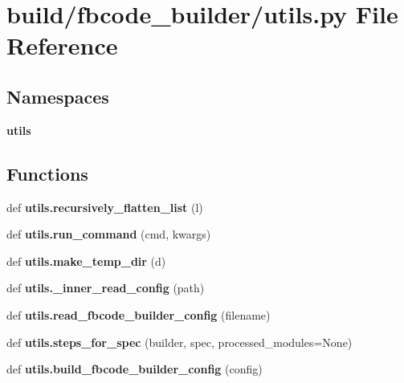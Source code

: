 \section{build/fbcode\+\_\+builder/utils.py File Reference}
\label{utils_8py}
\subsection*{Namespaces}
\begin{DoxyCompactItemize}
\item 
 {\bf utils}
\end{DoxyCompactItemize}
\subsection*{Functions}
\begin{DoxyCompactItemize}
\item 
def {\bf utils.\+recursively\+\_\+flatten\+\_\+list} (l)
\item 
def {\bf utils.\+run\+\_\+command} (cmd, kwargs)
\item 
def {\bf utils.\+make\+\_\+temp\+\_\+dir} (d)
\item 
def {\bf utils.\+\_\+inner\+\_\+read\+\_\+config} (path)
\item 
def {\bf utils.\+read\+\_\+fbcode\+\_\+builder\+\_\+config} (filename)
\item 
def {\bf utils.\+steps\+\_\+for\+\_\+spec} (builder, spec, processed\+\_\+modules=None)
\item 
def {\bf utils.\+build\+\_\+fbcode\+\_\+builder\+\_\+config} (config)
\end{DoxyCompactItemize}
